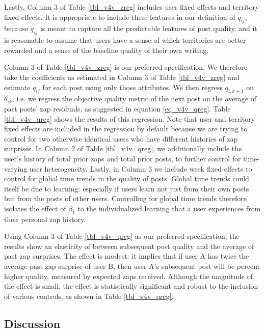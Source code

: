 Lastly, Column 3 of Table \ref{tbl_v4v_zreg} includes user fixed effects and territory fixed effects. It is appropriate to include these features in our definition of $q_{ij}$, because $q_{ij}$ is meant to capture all the predictable features of post quality, and it is reasonable to assume that users have a sense of which territories are better rewarded and a sense of the baseline quality of their own writing. 

Column 3 of Table \ref{tbl_v4v_zreg} is our preferred specification. We therefore take the coefficients as estimated in Column 3 of Table \ref{tbl_v4v_zreg} and estimate $q_{ij}$ for each post using only those attributes. We then regress $q_{i,k+1}$ on $\hat{\theta}_{ik}$, i.e. we regress the objective quality metric of the next post on the average of past posts' zap residuals, as suggested in equation \eqref{eq_v4v_qreg}. Table \ref{tbl_v4v_qreg} shows the results of this regression. Note that user and territory fixed effects are included in the regression by default because we are trying to control for two otherwise identical users who have different histories of zap surprises. In Column 2 of Table \ref{tbl_v4v_qreg}, we additionally include the user's history of total prior zaps and total prior posts, to further control for time-varying user heterogeneity. Lastly, in Column 3 we include week fixed effects to control for global time trends in the quality of posts. Global time trends could itself be due to learning: especially if users learn not just from their own posts but from the posts of other users. Controlling for global time trends therefore isolates the effect of $\beta_1$ to the individualized learning that a user experiences from their personal zap history.

Using Column 3 of Table \ref{tbl_v4v_qreg} as our preferred specification, the results show an elasticity of  between subsequent post quality and the average of past zap surprises. The effect is modest: it implies that if user A has twice the average past zap surprise of user B, then user A's subsequent post will be  percent higher quality, measured by expected zaps received.  Although the magnitude of the effect is small, the effect is statistically significant and robust to the inclusion of various controls, as shown in Table \ref{tbl_v4v_qreg}. 

\subsection{Discussion}

